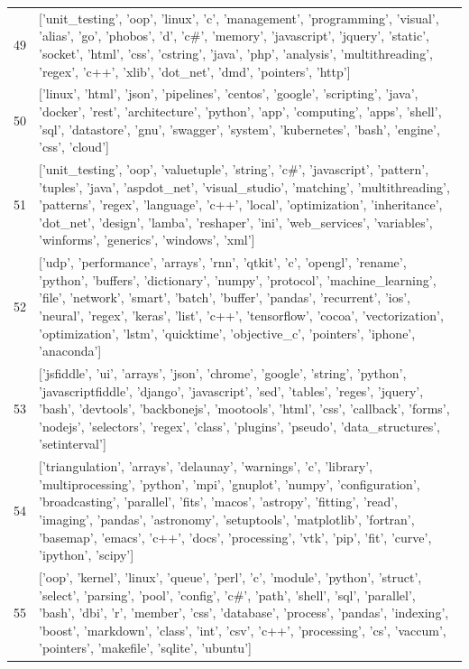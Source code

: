 \begin{center}
\begin{longtable}{|p{1.5cm}|p{12.5cm}|}
            49 & ['unit\_testing', 'oop', 'linux', 'c', 'management', 'programming', 'visual', 'alias', 'go', 'phobos', 'd', 'c\#', 'memory', 'javascript', 'jquery', 'static', 'socket', 'html', 'css', 'cstring', 'java', 'php', 'analysis', 'multithreading', 'regex', 'c++', 'xlib', 'dot\_net', 'dmd', 'pointers', 'http']  \\ 
            50 & ['linux', 'html', 'json', 'pipelines', 'centos', 'google', 'scripting', 'java', 'docker', 'rest', 'architecture', 'python', 'app', 'computing', 'apps', 'shell', 'sql', 'datastore', 'gnu', 'swagger', 'system', 'kubernetes', 'bash', 'engine', 'css', 'cloud']  \\ 
            51 & ['unit\_testing', 'oop', 'valuetuple', 'string', 'c\#', 'javascript', 'pattern', 'tuples', 'java', 'aspdot\_net', 'visual\_studio', 'matching', 'multithreading', 'patterns', 'regex', 'language', 'c++', 'local', 'optimization', 'inheritance', 'dot\_net', 'design', 'lamba', 'reshaper', 'ini', 'web\_services', 'variables', 'winforms', 'generics', 'windows', 'xml']  \\ 
            52 & ['udp', 'performance', 'arrays', 'rnn', 'qtkit', 'c', 'opengl', 'rename', 'python', 'buffers', 'dictionary', 'numpy', 'protocol', 'machine\_learning', 'file', 'network', 'smart', 'batch', 'buffer', 'pandas', 'recurrent', 'ios', 'neural', 'regex', 'keras', 'list', 'c++', 'tensorflow', 'cocoa', 'vectorization', 'optimization', 'lstm', 'quicktime', 'objective\_c', 'pointers', 'iphone', 'anaconda']  \\ 
            53 & ['jsfiddle', 'ui', 'arrays', 'json', 'chrome', 'google', 'string', 'python', 'javascriptfiddle', 'django', 'javascript', 'sed', 'tables', 'reges', 'jquery', 'bash', 'devtools', 'backbonejs', 'mootools', 'html', 'css', 'callback', 'forms', 'nodejs', 'selectors', 'regex', 'class', 'plugins', 'pseudo', 'data\_structures', 'setinterval']  \\ 
            54 & ['triangulation', 'arrays', 'delaunay', 'warnings', 'c', 'library', 'multiprocessing', 'python', 'mpi', 'gnuplot', 'numpy', 'configuration', 'broadcasting', 'parallel', 'fits', 'macos', 'astropy', 'fitting', 'read', 'imaging', 'pandas', 'astronomy', 'setuptools', 'matplotlib', 'fortran', 'basemap', 'emacs', 'c++', 'docs', 'processing', 'vtk', 'pip', 'fit', 'curve', 'ipython', 'scipy']  \\ 
            55 & ['oop', 'kernel', 'linux', 'queue', 'perl', 'c', 'module', 'python', 'struct', 'select', 'parsing', 'pool', 'config', 'c\#', 'path', 'shell', 'sql', 'parallel', 'bash', 'dbi', 'r', 'member', 'css', 'database', 'process', 'pandas', 'indexing', 'boost', 'markdown', 'class', 'int', 'csv', 'c++', 'processing', 'cs', 'vaccum', 'pointers', 'makefile', 'sqlite', 'ubuntu']  \\ 

\end{longtable}
\end{center}

